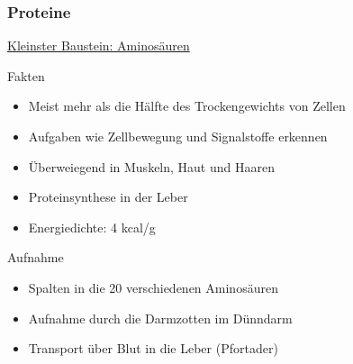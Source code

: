 \documentclass[xcolor=dvipsnames]{beamer}
\begin{document}
    \begin{frame}[allowframebreaks]
        \frametitle{Proteine}

        \underline{Kleinster Baustein: Aminosäuren}
        \begin{block}{Fakten}
            \begin{itemize}
                \setlength\itemsep{1em}
                \item Meist mehr als die Hälfte des Trockengewichts von Zellen
                \item Aufgaben wie Zellbewegung und Signalstoffe erkennen
                \item Überweiegend in Muskeln, Haut und Haaren
                \item Proteinsynthese in der Leber
                \item Energiedichte: 4 kcal/g
            \end{itemize}
        \end{block}

        \framebreak

        \begin{block}{Aufnahme}
            \begin{itemize}
                \setlength\itemsep{1em}
                \item Spalten in die 20 verschiedenen Aminosäuren
                \item Aufnahme durch die Darmzotten im Dünndarm
                \item Transport über Blut in die Leber (Pfortader)
            \end{itemize}
        \end{block}
    \end{frame}
\end{document}
